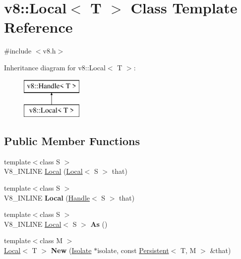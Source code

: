 \hypertarget{classv8_1_1_local}{}\section{v8\+:\+:Local$<$ T $>$ Class Template Reference}
\label{classv8_1_1_local}


{\ttfamily \#include $<$v8.\+h$>$}

Inheritance diagram for v8\+:\+:Local$<$ T $>$\+:\begin{figure}[H]
\begin{center}
\leavevmode
\includegraphics[height=2.000000cm]{classv8_1_1_local}
\end{center}
\end{figure}
\subsection*{Public Member Functions}
\begin{DoxyCompactItemize}
\item 
{\footnotesize template$<$class S $>$ }\\V8\+\_\+\+I\+N\+L\+I\+N\+E \hyperlink{classv8_1_1_local_a18d761713c1062a38f58a568fffe8f80}{Local} (\hyperlink{classv8_1_1_local}{Local}$<$ S $>$ that)
\item 
\hypertarget{classv8_1_1_local_a857c392e721d98a691cf638cc9ea1e8e}{}{\footnotesize template$<$class S $>$ }\\V8\+\_\+\+I\+N\+L\+I\+N\+E {\bfseries Local} (\hyperlink{classv8_1_1_handle}{Handle}$<$ S $>$ that)\label{classv8_1_1_local_a857c392e721d98a691cf638cc9ea1e8e}

\item 
\hypertarget{classv8_1_1_local_a18b55bc71ce2dcd084887097be4399eb}{}{\footnotesize template$<$class S $>$ }\\V8\+\_\+\+I\+N\+L\+I\+N\+E \hyperlink{classv8_1_1_local}{Local}$<$ S $>$ {\bfseries As} ()\label{classv8_1_1_local_a18b55bc71ce2dcd084887097be4399eb}

\item 
\hypertarget{classv8_1_1_local_ac9e9be9124f89169ffd49bed69f6bbea}{}{\footnotesize template$<$class M $>$ }\\\hyperlink{classv8_1_1_local}{Local}$<$ T $>$ {\bfseries New} (\hyperlink{classv8_1_1_isolate}{Isolate} $\ast$isolate, const \hyperlink{classv8_1_1_persistent}{Persistent}$<$ T, M $>$ \&that)\label{classv8_1_1_local_ac9e9be9124f89169ffd49bed69f6bbea}

\end{DoxyCompactItemize}

